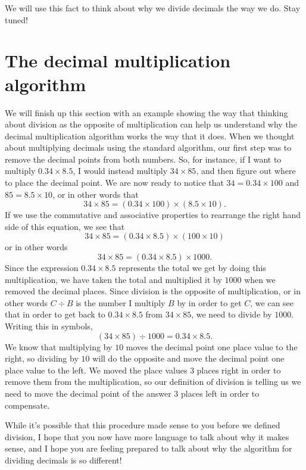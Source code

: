 \documentclass{ximera}
\begin{document}
We will use this fact to think about why we divide decimals the way we do. Stay tuned!


\section{The decimal multiplication algorithm}
We will finish up this section with an example showing the way that thinking about division as the opposite of multiplication can help us understand why the decimal multiplication algorithm works the way that it does. When we thought about multiplying decimals using the standard algorithm, our first step was to remove the decimal points from both numbers. So, for instance, if I want to multiply $0.34 \times 8.5$, I would instead multiply $34 \times 85$, and then figure out where to place the decimal point. We are now ready to notice that $34 = 0.34 \times 100$ and $85 = 8.5 \times 10$, or in other words that
\[
34 \times 85 = (0.34 \times 100) \times (8.5 \times 10).
\]
If we use the commutative and associative properties to rearrange the right hand side of this equation, we see that 
\[
34 \times 85 = (0.34 \times 8.5) \times (100 \times 10)
\]
or in other words
\[
34 \times 85 = (0.34 \times 8.5) \times 1000.
\]
Since the expression $0.34 \times 8.5$ represents the total we get by doing this multiplication, we have taken the total and multiplied it by $1000$ when we removed the decimal places. Since division is the opposite of multiplication, or in other words $C \div B$ is the number I multiply $B$ by in order to get $C$, we can see that in order to get back to $0.34 \times 8.5$ from $34 \times 85$, we need to divide by $1000$. Writing this in symbols, 
\[
(34 \times 85) \div 1000 = 0.34 \times 8.5.
\]
We know that multiplying by $10$ moves the decimal point one place value to the right, so dividing by $10$ will do the opposite and move the decimal point one place value to the left. We moved the place values $3$ places right in order to remove them from the multiplication, so our definition of division is telling us we need to move the decimal point of the answer $3$ places left in order to compensate.

While it's possible that this procedure made sense to you before we defined division, I hope that you now have more language to talk about why it makes sense, and I hope you are feeling prepared to talk about why the algorithm for dividing decimals is so different!
\end{document}
